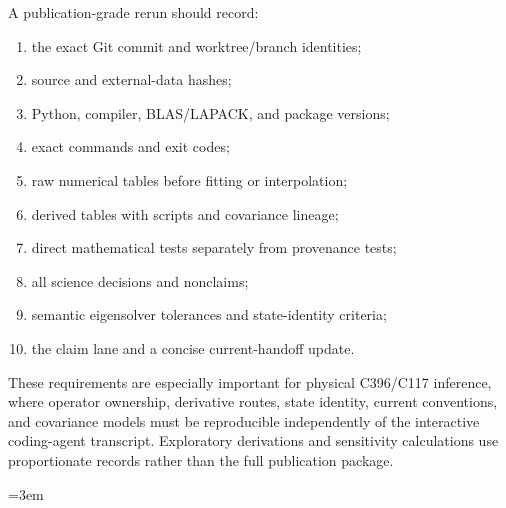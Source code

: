 \documentclass[11pt,oneside]{book}
\begin{document}
A publication-grade rerun should record:
\begin{enumerate}[label=(\arabic*)]
 \item the exact Git commit and worktree/branch identities;
 \item source and external-data hashes;
 \item Python, compiler, BLAS/LAPACK, and package versions;
 \item exact commands and exit codes;
 \item raw numerical tables before fitting or interpolation;
 \item derived tables with scripts and covariance lineage;
 \item direct mathematical tests separately from provenance tests;
 \item all science decisions and nonclaims;
 \item semantic eigensolver tolerances and state-identity criteria;
 \item the claim lane and a concise current-handoff update.
\end{enumerate}
These requirements are especially important for physical C396/C117 inference, where operator ownership, derivative routes, state identity, current conventions, and covariance models must be reproducible independently of the interactive coding-agent transcript.  Exploratory derivations and sensitivity calculations use proportionate records rather than the full publication package.

\backmatter
\begingroup
\small
\emergencystretch=3em
\printbibliography[heading=bibintoc,title={References}]
\endgroup
\end{document}
